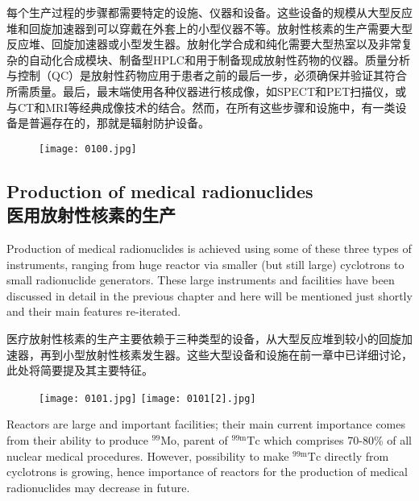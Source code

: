 \documentclass[dvipsnames, svgnames,a4paper,11pt]{article}
\begin{document}
每个生产过程的步骤都需要特定的设施、仪器和设备。这些设备的规模从大型反应堆和回旋加速器到可以穿戴在外套上的小型仪器不等。放射性核素的生产需要大型反应堆、回旋加速器或小型发生器。放射化学合成和纯化需要大型热室以及非常复杂的自动化合成模块、制备型HPLC和用于制备现成放射性药物的仪器。质量分析与控制（QC）是放射性药物应用于患者之前的最后一步，必须确保并验证其符合所需质量。最后，最末端使用各种仪器进行核成像，如SPECT和PET扫描仪，或与CT和MRI等经典成像技术的结合。然而，在所有这些步骤和设施中，有一类设备是普遍存在的，那就是辐射防护设备。

\begin{figure}[h]
    \centering
    \texttt{[image: 0100.jpg]}
     \label{fig96}
\end{figure}

\subsection{Production of medical radionuclides \\医用放射性核素的生产}


Production of medical radionuclides is achieved using some of these three types of
instruments, ranging from huge reactor via smaller (but still large) cyclotrons to small
radionuclide generators. These large instruments and facilities have been discussed
in detail in the previous chapter and here will be mentioned just shortly and their
main features re-iterated.

医疗放射性核素的生产主要依赖于三种类型的设备，从大型反应堆到较小的回旋加速器，再到小型放射性核素发生器。这些大型设备和设施在前一章中已详细讨论，此处将简要提及其主要特征。

\begin{figure}[htbp]
	\centering
    \texttt{[image: 0101.jpg]}    
    \hspace{0.1in}
    \texttt{[image: 0101[2].jpg]} 
     \label{fig97}
\end{figure}

Reactors are large and important facilities; their main current importance comes from
their ability to produce ${}^{99}\mathrm{Mo}$, parent of ${}^\mathrm{99m}\mathrm{Tc}$ which comprises 70-80\% of all nuclear
medical procedures. However, possibility to
make ${}^\mathrm{99m}\mathrm{Tc}$ directly from cyclotrons is growing,
hence importance of reactors for the production
of medical radionuclides may decrease in future.
\end{document}
